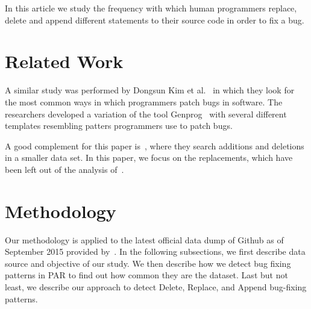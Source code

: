 \documentclass{sig-alternate-05-2015}
\begin{document}
In this article we study the frequency with which human programmers replace,
delete and append different statements to their source code in order to fix a
bug.

\section{Related Work}
A similar study was performed by Dongsun Kim et al.~\cite{kim2013} in which they
look for the most common ways in which programmers patch bugs in software. The
researchers developed a variation of the tool Genprog~\cite{weimer2009,legoues2012}
with several different templates resembling patters programmers use to patch
bugs.

A good complement for this paper is~\cite{zhong2015}, where they search additions and
deletions in a smaller data set. In this paper, we focus on the replacements,
which have been left out of the analysis of~\cite{zhong2015}.

\section{Methodology}
Our methodology is applied to the latest official data dump of Github as of
September 2015 provided by~\cite{dyer2013}. In the following subsections, we first
describe data source and objective of our study. We then describe how we detect
bug fixing patterns in PAR to find out how common they are the dataset. Last but
not least, we describe our approach to detect Delete, Replace, and Append
bug-fixing patterns.
\end{document}
